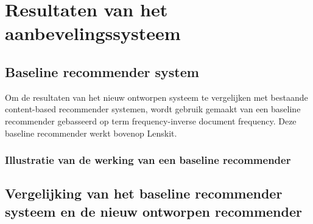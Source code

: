\chapter{Resultaten van het aanbevelingssysteem}\label{hs:resultaten}
\section{Baseline recommender system}
Om de resultaten van het nieuw ontworpen systeem te vergelijken met bestaande content-based recommender systemen, wordt gebruik gemaakt van een baseline recommender gebasseerd op term frequency-inverse document frequency. Deze baseline recommender werkt bovenop Lenskit.

\subsection{Illustratie van de werking van een baseline recommender}

\section{Vergelijking van het baseline recommender systeem en de nieuw ontworpen recommender}
